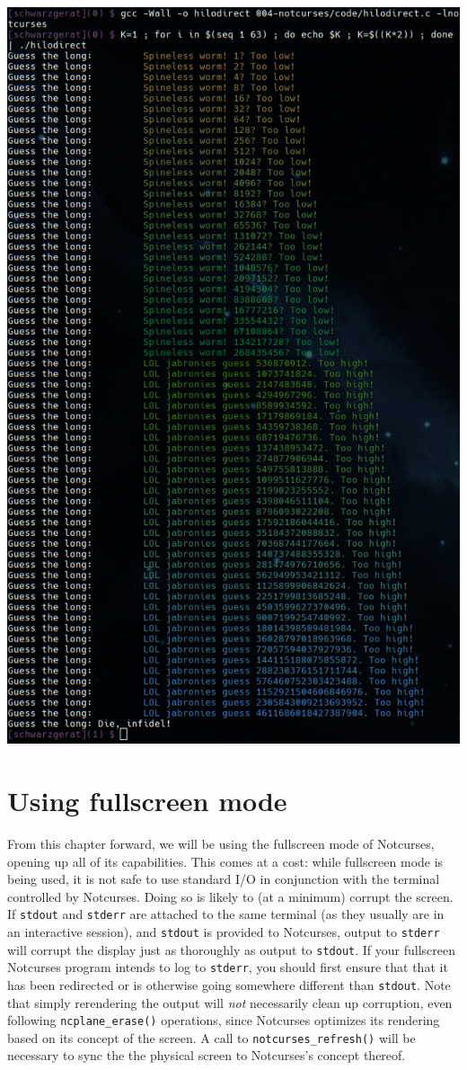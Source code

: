\documentclass[letterpaper,10pt]{article}
\begin{document}
\begin{center}
\includegraphics[width=.75\linewidth]{media/hilodirect.png}
\end{center}
\newpage

\section{Using fullscreen mode}
From this chapter forward, we will be using the fullscreen mode of Notcurses,
opening up all of its capabilities. This comes at a cost: while fullscreen mode
is being used, it is not safe to use standard I/O in conjunction with the
terminal controlled by Notcurses. Doing so is likely to (at a minimum) corrupt
the screen. If \texttt{stdout} and \texttt{stderr} are attached to the same
terminal (as they usually are in an interactive session), and \texttt{stdout}
is provided to Notcurses, output to \texttt{stderr} will corrupt the display
just as thoroughly as output to \texttt{stdout}. If your fullscreen Notcurses
program intends to log to \texttt{stderr}, you should first ensure that that
it has been redirected or is otherwise going somewhere different than
\texttt{stdout}. Note that simply rerendering the output will \textit{not}
necessarily clean up corruption, even following \texttt{ncplane\_erase()}
operations, since Notcurses optimizes its rendering based on its concept of the
screen. A call to \texttt{notcurses\_refresh()} will be necessary to sync the
the physical screen to Notcurses's concept thereof.
\end{document}
